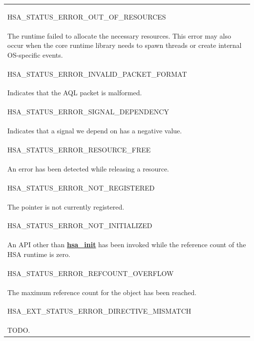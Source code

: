 \documentclass[final]{book}
\newcommand{\reffun}[1]{\textbf{#1}}
\newcommand{\reftyp}[1]{#1}
\newcommand{\refenu}[1]{\reftyp{#1}}
\begin{document}
\begin{longtable}{@{\hspace{2em}}p{\linewidth-2em}}
\hspace{-2em}\hypertarget{group__status_1ggad755322e7ff95456520e8abdbe90d225a1a77fcf36d0d140874c4361ab093eff7}{\refenu{HSA_STATUS_ERROR_OUT_OF_RESOURCES}} \\The runtime failed to allocate the necessary resources. This error may also occur when the core runtime library needs to spawn threads or create internal OS-specific events.\\[2mm]
\hspace{-2em}\hypertarget{group__status_1ggad755322e7ff95456520e8abdbe90d225a3fad45f72111eb99de5d8daef26c372c}{\refenu{HSA_STATUS_ERROR_INVALID_PACKET_FORMAT}} \\Indicates that the AQL packet is malformed.\\[2mm]
\hspace{-2em}\hypertarget{group__status_1ggad755322e7ff95456520e8abdbe90d225a160ebf19ea514abf81a8ac958c0e9f12}{\refenu{HSA_STATUS_ERROR_SIGNAL_DEPENDENCY}} \\Indicates that a signal we depend on has a negative value.\\[2mm]
\hspace{-2em}\hypertarget{group__status_1ggad755322e7ff95456520e8abdbe90d225a6406af88203fcbec4179fbb71cc66b65}{\refenu{HSA_STATUS_ERROR_RESOURCE_FREE}} \\An error has been detected while releasing a resource.\\[2mm]
\hspace{-2em}\hypertarget{group__status_1ggad755322e7ff95456520e8abdbe90d225a8b2f486dd206aa5545e8b0f2c1e2a568}{\refenu{HSA_STATUS_ERROR_NOT_REGISTERED}} \\The pointer is not currently registered.\\[2mm]
\hspace{-2em}\hypertarget{group__status_1ggad755322e7ff95456520e8abdbe90d225a34ea59ade5bfce95eee935238a99f5b5}{\refenu{HSA_STATUS_ERROR_NOT_INITIALIZED}} \\An API other than \hyperlink{group__initshutdown_1ga5b8574433e7dbcbd31ea397a02e3c32b}{\reffun{hsa_init}} has been invoked while the reference count of the HSA runtime is zero.\\[2mm]
\hspace{-2em}\hypertarget{group__status_1ggad755322e7ff95456520e8abdbe90d225aa9218eed04d1d2ffc5ed8f33f2cd1c9b}{\refenu{HSA_STATUS_ERROR_REFCOUNT_OVERFLOW}} \\The maximum reference count for the object has been reached.\\[2mm]
\hspace{-2em}\hypertarget{group__status_1ggad755322e7ff95456520e8abdbe90d225ae16bcc443d027a0b880fd58f0443227b}{\refenu{HSA_EXT_STATUS_ERROR_DIRECTIVE_MISMATCH}} \\TODO.\\[2mm]

\end{longtable}
\end{document}
